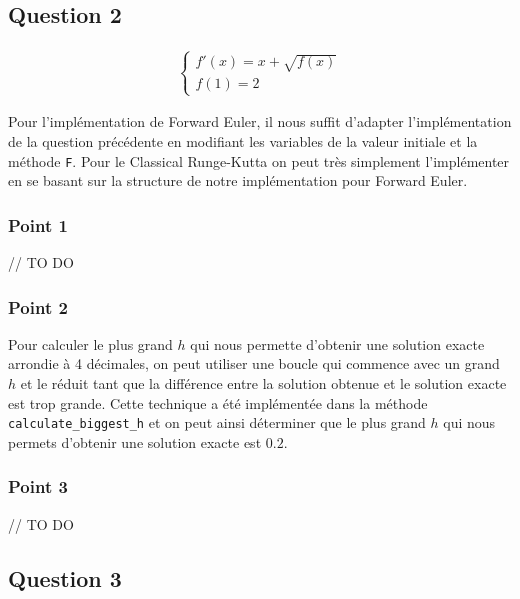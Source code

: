 \subsection{Question 2}

\begin{equation}
	\begin{aligned}
	\begin{cases}
	f'(x) = x + \sqrt{f(x)}\\
	f(1) = 2
	\end{cases}
	\end{aligned}
\end{equation}

Pour l'implémentation de Forward Euler, il nous suffit d'adapter l'implémentation de la question précédente en modifiant les variables de la valeur initiale et la méthode \texttt{F}. Pour le Classical Runge-Kutta on peut très simplement l'implémenter en se basant sur la structure de notre implémentation pour Forward Euler.


\subsubsection{Point 1}

// TO DO

\subsubsection{Point 2}

Pour calculer le plus grand $h$ qui nous permette d'obtenir une solution exacte arrondie à 4 décimales, on peut utiliser une boucle qui commence avec un grand $h$ et le réduit tant que la différence entre la solution obtenue et le solution exacte est trop grande. Cette technique a été implémentée dans la méthode \texttt{calculate\_biggest\_h} et on peut ainsi déterminer que le plus grand $h$ qui nous permets d'obtenir une solution exacte est $0.2$.

\subsubsection{Point 3}

// TO DO

\subsection{Question 3}

